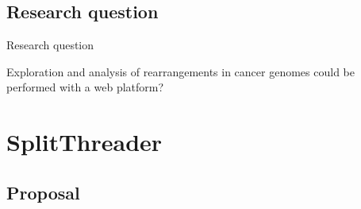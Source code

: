 \documentclass[10pt]{beamer}
\newcommand{\1}{
	\setbeamertemplate{background}{
		\texttt{[image: img/1]}
		\tikz[overlay] \fill[fill opacity=0.75,fill=white] (0,0) rectangle (-\paperwidth,\paperheight);
	}
}
\begin{document}
\subsection{Research question}

\begin{frame}{Research question}{}	
	\begin{block}{}
		Exploration and analysis of rearrangements in cancer genomes could be performed with a web platform?
	\end{block}	
\end{frame}


\section{SplitThreader}

\subsection{Proposal}
\end{document}
